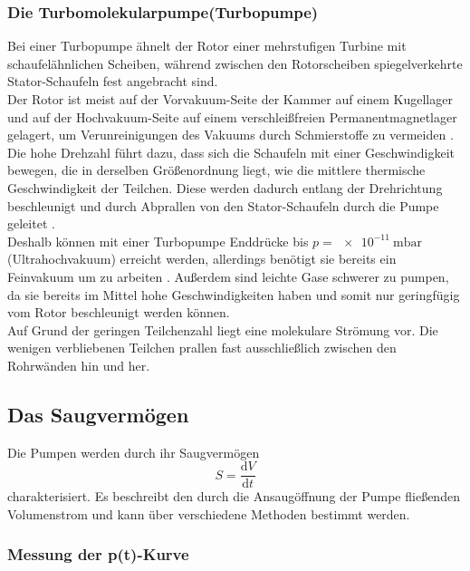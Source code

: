 \subsubsection{Die Turbomolekularpumpe(Turbopumpe)}

Bei einer Turbopumpe ähnelt der Rotor einer mehrstufigen Turbine mit schaufelähnlichen Scheiben, während zwischen den Rotorscheiben spiegelverkehrte Stator-Schaufeln fest angebracht sind.\\
Der Rotor ist meist auf der Vorvakuum-Seite der Kammer auf einem Kugellager und auf der Hochvakuum-Seite auf einem verschleißfreien Permanentmagnetlager gelagert, um Verunreinigungen des Vakuums durch Schmierstoffe zu vermeiden \cite{Pfeiffer}. Die hohe Drehzahl führt dazu, dass sich die Schaufeln mit einer Geschwindigkeit bewegen, die in derselben Größenordnung liegt, wie die mittlere thermische Geschwindigkeit der Teilchen. Diese werden dadurch entlang der Drehrichtung beschleunigt und durch Abprallen von den Stator-Schaufeln durch die Pumpe geleitet \cite{Pfeiffer}.\\
Deshalb können mit einer Turbopumpe Enddrücke bis $p=\SI{e-11}{\milli\bar}$ (Ultrahochvakuum) erreicht werden, allerdings benötigt sie bereits ein Feinvakuum um zu arbeiten \cite{Pfeiffer}. Außerdem sind leichte Gase schwerer zu pumpen, da sie bereits im Mittel hohe Geschwindigkeiten haben und somit nur geringfügig vom Rotor beschleunigt werden können.\\
Auf Grund der geringen Teilchenzahl liegt eine molekulare Strömung vor. Die wenigen verbliebenen Teilchen prallen fast ausschließlich zwischen den Rohrwänden hin und her.

\subsection{Das Saugvermögen}
Die Pumpen werden durch ihr Saugvermögen 
\[
S=\frac{\mathrm{d}V}{\mathrm{d}t}
\]
charakterisiert.
Es beschreibt den durch die Ansaugöffnung der Pumpe fließenden Volumenstrom und kann über verschiedene Methoden bestimmt werden.

\subsubsection{Messung der p(t)-Kurve}

